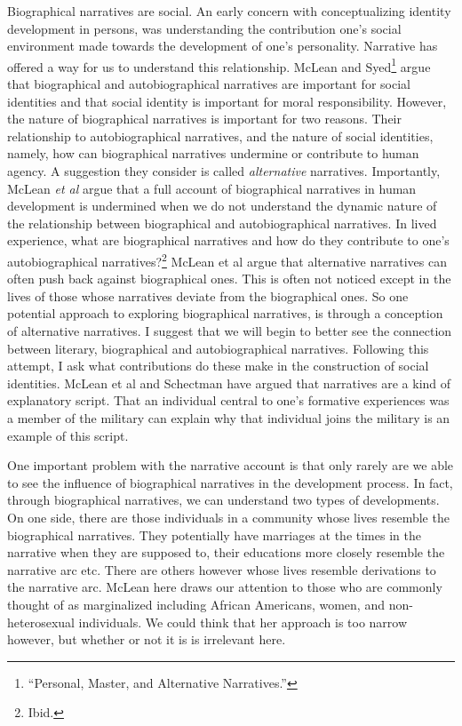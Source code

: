 \documentclass[phdthesis,12pt,final]{wuthesis}
\theoremstyle{definition}
\theoremstyle{definition}
\theoremstyle{definition}
\theoremstyle{definition}
\theoremstyle{remark}
\begin{document}
Biographical narratives are social. An early concern with conceptualizing identity development in persons, was understanding the contribution one's social environment made towards the development of one's personality. Narrative has offered a way for us to understand this relationship. McLean and Syed\footnote{{``Personal, {Master}, and {Alternative Narratives}.''}} argue that biographical and autobiographical narratives are important for social identities and that social identity is important for moral responsibility. However, the nature of biographical narratives is important for two reasons. Their relationship to autobiographical narratives, and the nature of social identities, namely, how can biographical narratives undermine or contribute to human agency. A suggestion they consider is called \emph{alternative} narratives. Importantly, McLean \emph{et al} argue that a full account of biographical narratives in human development is undermined when we do not understand the dynamic nature of the relationship between biographical and autobiographical narratives. In lived experience, what are biographical narratives and how do they contribute to one's autobiographical narratives?\footnote{Ibid.} McLean et al argue that alternative narratives can often push back against biographical ones. This is often not noticed except in the lives of those whose narratives deviate from the biographical ones. So one potential approach to exploring biographical narratives, is through a conception of alternative narratives. I suggest that we will begin to better see the connection between literary, biographical and autobiographical narratives. Following this attempt, I ask what contributions do these make in the construction of social identities. McLean et al and Schectman have argued that narratives are a kind of explanatory script. That an individual central to one's formative experiences was a member of the military can explain why that individual joins the military is an example of this script.

One important problem with the narrative account is that only rarely are we able to see the influence of biographical narratives in the development process. In fact, through biographical narratives, we can understand two types of developments. On one side, there are those individuals in a community whose lives resemble the biographical narratives. They potentially have marriages at the times in the narrative when they are supposed to, their educations more closely resemble the narrative arc etc. There are others however whose lives resemble derivations to the narrative arc. McLean here draws our attention to those who are commonly thought of as marginalized including African Americans, women, and non-heterosexual individuals. We could think that her approach is too narrow however, but whether or not it is is irrelevant here.
\end{document}
